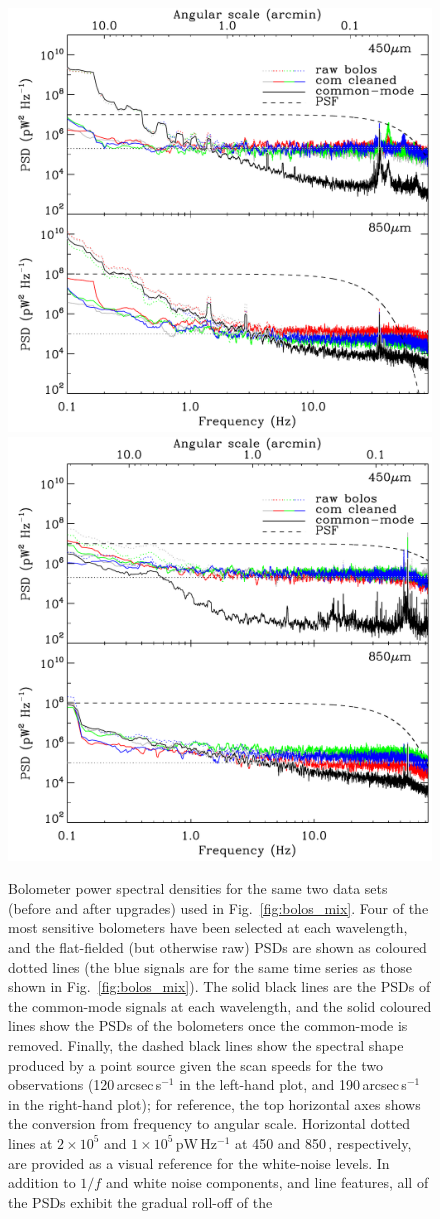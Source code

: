 \documentclass[useAMS,usenatbib,nofootinbib]{mn2e}
\begin{document}
\begin{figure}
\centering
\includegraphics[width=0.49\linewidth]{pspec_s2sro.pdf}
\includegraphics[width=0.49\linewidth]{pspec.pdf}
\caption{Bolometer power spectral densities for the same two data sets
  (before and after upgrades) used in Fig.~\ref{fig:bolos_mix}. Four
  of the most sensitive bolometers have been selected at each
  wavelength, and the flat-fielded (but otherwise raw) PSDs are shown
  as coloured dotted lines (the blue signals are for the same time
  series as those shown in Fig.~\ref{fig:bolos_mix}).  The solid black
  lines are the PSDs of the common-mode signals at each wavelength,
  and the solid coloured lines show the PSDs of the bolometers once
  the common-mode is removed.  Finally, the dashed black lines show
  the spectral shape produced by a point source given the scan speeds
  for the two observations (120\,arcsec\,s$^{-1}$ in the left-hand
  plot, and 190\,arcsec\,s$^{-1}$ in the right-hand plot); for
  reference, the top horizontal axes shows the conversion from
  frequency to angular scale. Horizontal dotted lines at $2 \times
  10^5$ and $1 \times 10^5$\,pW\,Hz$^{-1}$ at 450 and 850\,\micron,
  respectively, are provided as a visual reference for the white-noise
  levels. In addition to $1/f$ and white noise components, and line
  features, all of the PSDs exhibit the gradual roll-off of the
}
\end{figure}
\end{document}
